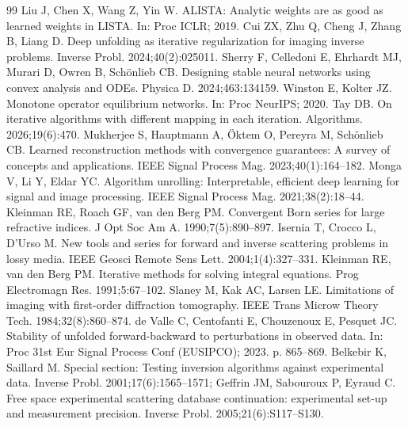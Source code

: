 \documentclass[UTF8,a4paper,11pt]{ctexart}
\begin{document}
\begin{thebibliography}{99}
Liu J, Chen X, Wang Z, Yin W. ALISTA: Analytic weights are as good as learned weights in LISTA. In: Proc ICLR; 2019.
Cui ZX, Zhu Q, Cheng J, Zhang B, Liang D. Deep unfolding as iterative regularization for imaging inverse problems. Inverse Probl. 2024;40(2):025011.
Sherry F, Celledoni E, Ehrhardt MJ, Murari D, Owren B, Sch\"onlieb CB. Designing stable neural networks using convex analysis and ODEs. Physica D. 2024;463:134159.
Winston E, Kolter JZ. Monotone operator equilibrium networks. In: Proc NeurIPS; 2020.
Tay DB. On iterative algorithms with different mapping in each iteration. Algorithms. 2026;19(6):470.
Mukherjee S, Hauptmann A, \"Oktem O, Pereyra M, Sch\"onlieb CB. Learned reconstruction methods with convergence guarantees: A survey of concepts and applications. IEEE Signal Process Mag. 2023;40(1):164--182.
Monga V, Li Y, Eldar YC. Algorithm unrolling: Interpretable, efficient deep learning for signal and image processing. IEEE Signal Process Mag. 2021;38(2):18--44.
Kleinman RE, Roach GF, van den Berg PM. Convergent Born series for large refractive indices. J Opt Soc Am A. 1990;7(5):890--897.
Isernia T, Crocco L, D'Urso M. New tools and series for forward and inverse scattering problems in lossy media. IEEE Geosci Remote Sens Lett. 2004;1(4):327--331.
Kleinman RE, van den Berg PM. Iterative methods for solving integral equations. Prog Electromagn Res. 1991;5:67--102.
Slaney M, Kak AC, Larsen LE. Limitations of imaging with first-order diffraction tomography. IEEE Trans Microw Theory Tech. 1984;32(8):860--874.
de Valle C, Centofanti E, Chouzenoux E, Pesquet JC. Stability of unfolded forward-backward to perturbations in observed data. In: Proc 31st Eur Signal Process Conf (EUSIPCO); 2023. p. 865--869.
Belkebir K, Saillard M. Special section: Testing inversion algorithms against experimental data. Inverse Probl. 2001;17(6):1565--1571; Geffrin JM, Sabouroux P, Eyraud C. Free space experimental scattering database continuation: experimental set-up and measurement precision. Inverse Probl. 2005;21(6):S117--S130.
\end{thebibliography}
\end{document}
